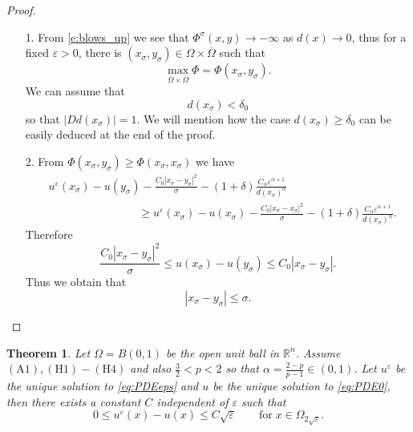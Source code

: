 \documentclass[11pt,reqno]{amsart}
\numberwithin{figure}{section}
\theoremstyle{plain}
\newtheorem{thm}{Theorem}[section]
\theoremstyle{remark}
\numberwithin{equation}{section}
\begin{document}
\begin{proof}
\begin{enumerate}
    \item[1.] From \eqref{e:blows_up} we see that $\Phi^\sigma(x,y)\to -\infty$ as $d(x)\to 0$, thus for a fixed $\varepsilon>0$, there is $(x_{\sigma},y_\sigma)\in \Omega\times\overline{\Omega}$ such that 
    \begin{equation*}
        \max_{\overline{\Omega}\times \overline{\Omega}} \Phi = \Phi(x_\sigma,y_\sigma).
    \end{equation*}
    We can assume that 
    \begin{equation}\label{e:ass_delta0}
        d(x_\sigma) < \delta_0
    \end{equation}
    so that $|Dd(x_\sigma)| = 1$. We will mention how the case $d(x_\sigma)\geq \delta_0$ can be easily deduced at the end of the proof.
    \item[2.] From $\Phi(x_\sigma,y_\sigma)\geq \Phi(x_\sigma,x_\sigma)$ we have
    \begin{align*}
        & u^\varepsilon(x_\sigma) - u(y_\sigma) - \frac{C_0|x_\sigma-y_\sigma |^2}{\sigma}- \left(1+\delta\right)\frac{C_\alpha\varepsilon^{\alpha+1}}{d(x_\sigma)^{\alpha}} \\
        & \qquad\qquad\qquad\qquad \geq u^\varepsilon(x_\sigma) - u(x_\sigma) - \frac{C_0|x_\sigma-x_\sigma |^2}{\sigma}- \left(1+\delta\right)\frac{C_\alpha\varepsilon^{\alpha+1}}{d(x_\sigma)^{\alpha}}.
    \end{align*}
    Therefore
    \begin{equation*}
        \frac{C_0|x_\sigma - y_\sigma|^2}{\sigma} \leq u(x_\sigma) - u(y_\sigma) \leq C_0|x_\sigma - y_\sigma|.
    \end{equation*}
    Thus we obtain that
    \begin{equation*}
        |x_\sigma - y_\sigma|\leq \sigma.
    \end{equation*}
\end{enumerate}
\end{proof}



\begin{thm}\label{thm:rate_doubling1} Let $\Omega = B(0,1)$ be the open unit ball in $\mathbb{R}^n$. Assume $\mathrm{(A1)},\mathrm{(H1)}-\mathrm{(H4)}$ and also $\frac{3}{2}<p<2$ so that $\alpha = \frac{2-p}{p-1} \in (0,1)$. Let $u^\varepsilon$ be the unique solution to \eqref{eq:PDEeps} and $u$ be the unique solution to \eqref{eq:PDE0}, then there exists a constant $C$ independent of $\varepsilon$ such that
\begin{equation*}
    0\leq u^\varepsilon(x) - u(x) \leq C\sqrt{\varepsilon} \qquad\text{for}\;x\in \Omega_{2\sqrt{\varepsilon}}.
\end{equation*}

\end{thm}
\end{document}
